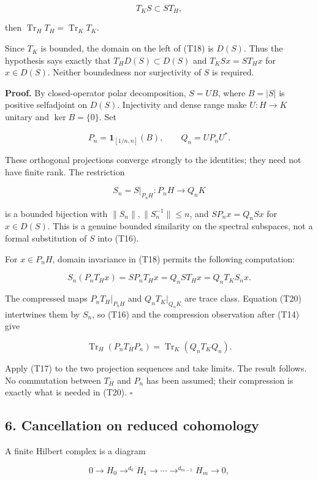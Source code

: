 \documentclass[
  11pt,
]{article}
\begin{document}
\[
T_KS\subset ST_H,                                            \tag{T18}
\]

then \(\operatorname{Tr}_H T_H=\operatorname{Tr}_K T_K\).

Since \(T_K\) is bounded, the domain on the left of (T18) is \(D(S)\).
Thus the hypothesis says exactly that \(T_HD(S)\subset D(S)\) and
\(T_KSx=ST_Hx\) for \(x\in D(S)\). Neither boundedness nor surjectivity
of \(S\) is required.

\textbf{Proof.} By closed-operator polar decomposition, \(S=UB\), where
\(B=|S|\) is positive selfadjoint on \(D(S)\). Injectivity and dense
range make \(U:H\to K\) unitary and \(\ker B=\{0\}\). Set

\[
P_n=\mathbf1_{[1/n,n]}(B),\qquad Q_n=UP_nU^*.                \tag{T19}
\]

These orthogonal projections converge strongly to the identities; they
need not have finite rank. The restriction

\[
S_n=S|_{P_nH}:P_nH\longrightarrow Q_nK
\]

is a bounded bijection with \(\|S_n\|,\|S_n^{-1}\|\leq n\), and
\(SP_nx=Q_nSx\) for \(x\in D(S)\). This is a genuine bounded similarity
on the spectral subspaces, not a formal substitution of \(S\) into
(T16).

For \(x\in P_nH\), domain invariance in (T18) permits the following
computation:

\[
S_n(P_nT_Hx)=SP_nT_Hx
=Q_nST_Hx
=Q_nT_KS_nx.                                                \tag{T20}
\]

The compressed maps \(P_nT_H|_{P_nH}\) and \(Q_nT_K|_{Q_nK}\) are trace
class. Equation (T20) intertwines them by \(S_n\), so (T16) and the
compression observation after (T14) give

\[
\operatorname{Tr}_H(P_nT_HP_n)
=\operatorname{Tr}_K(Q_nT_KQ_n).
\]

Apply (T17) to the two projection sequences and take limits. The result
follows. No commutation between \(T_H\) and \(P_n\) has been assumed;
their compression is exactly what is needed in (T20). \(\square\)

\subsection{6. Cancellation on reduced
cohomology}\label{cancellation-on-reduced-cohomology}

A finite Hilbert complex is a diagram

\[
0\longrightarrow H_0\mathop{\longrightarrow}^{d_0}H_1
\longrightarrow\cdots\mathop{\longrightarrow}^{d_{m-1}}H_m
\longrightarrow0,                                          \tag{T21}
\]
\end{document}
